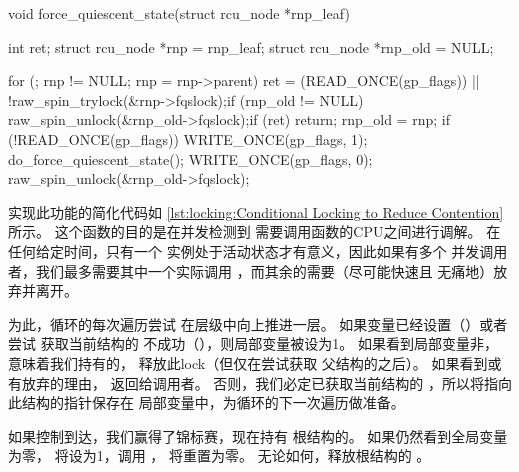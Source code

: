 \begin{listing}
\begin{fcvlabel}
\begin{VerbatimL}[commandchars=\\\[\]]
void force_quiescent_state(struct rcu_node *rnp_leaf)
{
	int ret;
	struct rcu_node *rnp = rnp_leaf;
	struct rcu_node *rnp_old = NULL;

	for (; rnp != NULL; rnp = rnp->parent) {	\lnlbl[loop:b]
		ret = (READ_ONCE(gp_flags)) ||		
		       !raw_spin_trylock(&rnp->fqslock);\lnlbl[trylock]
		if (rnp_old != NULL)			
			raw_spin_unlock(&rnp_old->fqslock);\lnlbl[rel1]
		if (ret)				\lnlbl[giveup]
			return;				\lnlbl[return]
		rnp_old = rnp;				\lnlbl[save]
	}						\lnlbl[loop:e]
	if (!READ_ONCE(gp_flags)) {			
		WRITE_ONCE(gp_flags, 1);		
		do_force_quiescent_state();		\lnlbl[invoke]
		WRITE_ONCE(gp_flags, 0);		
	}
	raw_spin_unlock(&rnp_old->fqslock);		\lnlbl[rel2]
}
\end{VerbatimL}
\end{fcvlabel}
\caption{通过条件加锁减少竞争}
\label{lst:locking:Conditional Locking to Reduce Contention}
\end{listing}

实现此功能的简化代码如
\cref{lst:locking:Conditional Locking to Reduce Contention}所示。
这个函数的目的是在并发检测到
需要调用函数的CPU之间进行调解。
在任何给定时间，只有一个
实例处于活动状态才有意义，因此如果有多个
并发调用者，我们最多需要其中一个实际调用
，而其余的需要（尽可能快速且
无痛地）放弃并离开。

\begin{fcvref}
为此，循环的每次遍历尝试
在层级中向上推进一层。
如果变量已经设置（）或者尝试
获取当前结构的
不成功（），则局部变量被设为1。
如果看到局部变量非，
意味着我们持有的，
释放此lock（但仅在尝试获取
父结构的之后）。
如果看到或~
有放弃的理由，
返回给调用者。
否则，我们必定已获取当前结构的
，所以将指向此结构的指针保存在
局部变量中，为循环的下一次遍历做准备。

如果控制到达，我们赢得了锦标赛，现在持有
根结构的。
如果仍然看到全局变量为零，
将设为1，调用
，
将重置为零。
无论如何，释放根结构的
。
\end{fcvref}

